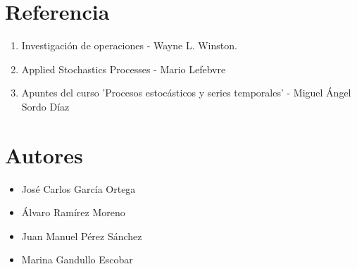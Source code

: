 \section{Referencia}
\begin{enumerate}
	\item Investigación de operaciones - Wayne L. Winston.
	\item Applied Stochastics Processes - Mario Lefebvre
	\item Apuntes del curso 'Procesos estocásticos y series temporales' - Miguel Ángel Sordo Díaz
\end{enumerate}

\section{Autores}
\begin{itemize}
	\item José Carlos García Ortega
	\item Álvaro Ramírez Moreno
	\item Juan Manuel Pérez Sánchez
	\item Marina Gandullo Escobar
\end{itemize}
